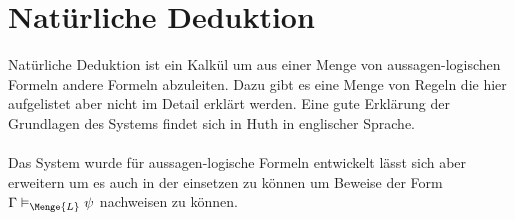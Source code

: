 
\section{Natürliche Deduktion} %
\label{sub:natuerliche_folgerung}
Natürliche Deduktion ist ein Kalkül um aus einer Menge von aussagen-logischen Formeln andere Formeln abzuleiten.
Dazu gibt es eine Menge von Regeln die hier aufgelistet aber nicht im Detail erklärt werden.
Eine gute Erklärung der Grundlagen des Systems findet sich in Huth \cite[Kapitel 1.2 (natural deduction)]{huth2004logic} in englischer Sprache.\\
\\
Das System wurde für aussagen-logische Formeln entwickelt lässt sich aber erweitern um es auch in der \ML einsetzen zu können um Beweise der Form $\Gamma \vDash_\Menge{L} \psi$ nachweisen zu können.


